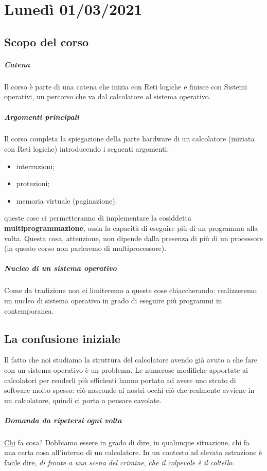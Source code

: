 \chapter{Lunedì 01/03/2021}
\section{Scopo del corso}
\paragraph{Catena} Il corso è parte di una catena che inizia con Reti logiche e finisce con Sistemi operativi, un percorso che va dal calcolatore al sistema operativo.
\paragraph{Argomenti principali} Il corso completa la spiegazione della parte hardware di un calcolatore (iniziata con Reti logiche) introducendo i seguenti argomenti:
\begin{itemize}
	\item interruzioni;
	\item protezioni;
	\item memoria virtuale (paginazione).
\end{itemize}
queste cose ci permetteranno di implementare la cosiddetta \textbf{multiprogrammazione}, ossia la capacità di eseguire più di un programma alla volta. Questa cosa, attenzione, non dipende dalla presenza di più di un processore (in questo corso non parleremo di multiprocessore).
\paragraph{Nucleo di un sistema operativo} Come da tradizione non ci limiteremo a queste cose chiaccherando: realizzeremo un nucleo di sistema operativo in grado di eseguire più programmi in contemporanea.

\section{La confusione iniziale} 
Il fatto che noi studiamo la struttura del calcolatore avendo già avuto a che fare con un sistema operativo è un problema. Le numerose modifiche apportate ai calcolatori per renderli più efficienti hanno portato ad avere uno strato di software molto spesso: ciò nasconde ai nostri occhi ciò che realmente avviene in un calcolatore, quindi ci porta a pensare cavolate.
\paragraph{Domanda da ripetersi ogni volta} \underline{\underline{Chi}} fa cosa? Dobbiamo essere in grado di dire, in qualunque situazione, chi fa una certa cosa all'interno di un calcolatore. In un contesto ad elevata astrazione è facile dire, \emph{di fronte a una scena del crimine}, \emph{che il colpevole è il coltello}.
